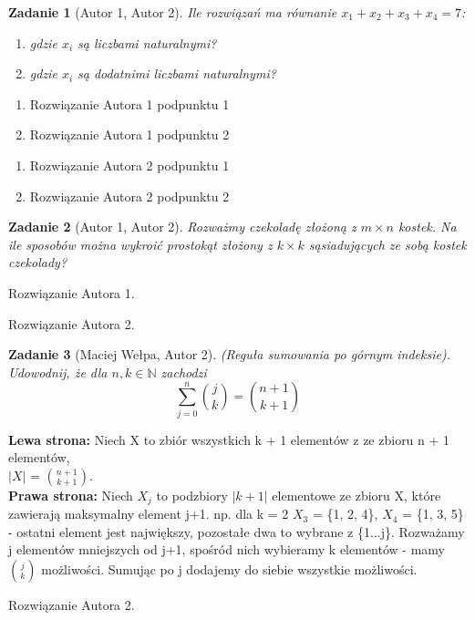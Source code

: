 \documentclass{mwart}
\newtheorem{zad}{Zadanie}[section]
\begin{document}
\begin{zad}[Autor 1, Autor 2]
    Ile rozwiązań ma równanie $x_1 + x_2+x_3+x_4 = 7$:
    \begin{enumerate}
        \item gdzie $x_i$ są liczbami naturalnymi?
        \item gdzie $x_i$ są dodatnimi liczbami naturalnymi?
    \end{enumerate}
\end{zad}
\begin{mdframed}
    \begin{enumerate}
        \item Rozwiązanie Autora 1 podpunktu 1
        \item Rozwiązanie Autora 1 podpunktu 2
    \end{enumerate}
\end{mdframed}
\begin{mdframed}
    \begin{enumerate}
        \item Rozwiązanie Autora 2 podpunktu 1
        \item Rozwiązanie Autora 2 podpunktu 2
    \end{enumerate}
\end{mdframed}




\begin{zad}[Autor 1, Autor 2]
    Rozważmy czekoladę złożoną z $m\times n$ kostek.
    Na ile sposobów można wykroić prostokąt złożony z $k \times k$
    sąsiadujących ze sobą kostek czekolady?
\end{zad}
\begin{mdframed}
    Rozwiązanie Autora 1.
\end{mdframed}
\begin{mdframed}
    Rozwiązanie Autora 2.
\end{mdframed}




\begin{zad}[Maciej Wełpa, Autor 2]
    (Reguła sumowania po górnym indeksie). Udowodnij, że dla
    $n, k \in \mathbb{N}$ zachodzi
    \[\sum_{j=0}^n\binom{j}{k} = \binom{n+1}{k+1}\]
\end{zad}
\begin{mdframed}
    \textbf{Lewa strona:}
    Niech X to zbiór wszystkich k + 1 elementów z ze zbioru n + 1 elementów, \\
    \(|X|\) = \(\binom{n + 1}{k + 1}\). \\
    \textbf{Prawa strona:} Niech \( X_j \) to podzbiory \(|k+1|\) elementowe ze zbioru X, które
    zawierają maksymalny element j+1. np. dla k = 2 \( X_3 \) = \{1, 2, 4\}, \( X_4 \) = \{1, 3, 5\}
    - ostatni element jest największy, pozostałe dwa to wybrane z \{1...j\}. Rozważamy j elementów mniejszych od j+1, spośród nich wybieramy k elementów - mamy \(\binom{j}{k}\) możliwości. Sumując po j dodajemy do siebie wszystkie możliwości.
\end{mdframed}
\begin{mdframed}
    Rozwiązanie Autora 2.
\end{mdframed}
\end{document}
